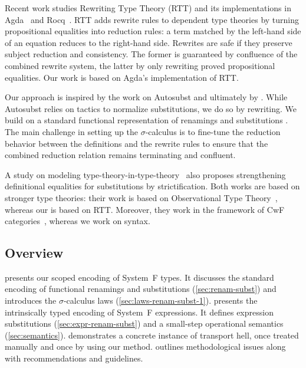 \documentclass[manuscript,screen,review,anonymous,acmsmall]{acmart}
\begin{document}
Recent work studies Rewriting Type Theory (RTT)
\cite{10.1145/3434341} and its implementations in Agda~\cite{cockx:LIPIcs.TYPES.2019.2} and
Rocq~\cite{leray_et_al:LIPIcs.ITP.2024.26,10.1145/3776704}. 
RTT adds rewrite rules to dependent type theories
by turning propositional equalities into reduction rules: a term matched by the
left-hand side of an equation reduces to the right-hand side. 
Rewrites are safe if they preserve subject reduction and
consistency. The former is guaranteed by confluence of the combined
rewrite system, the latter by only rewriting
proved propositional equalities.
Our work is based on Agda's implementation of RTT.

Our approach is inspired by the work on Autosubst
\cite{schafer2015autosubst,Stark:2020:Mechanising,10.1145/3293880.3294101}
and ultimately by \citet{10.1145/96709.96712}.
While Autosubst relies on tactics to normalize substitutions, we do so
by rewriting. We build on a standard functional representation of
renamings and substitutions \cite{DBLP:journals/jar/BentonHKM12}. 
The main challenge in setting up the $\sigma$-calculus is to fine-tune the
reduction behavior between the definitions and the rewrite rules to ensure that the combined
reduction relation remains terminating and confluent.

A study on modeling type-theory-in-type-theory~\cite{DBLP:journals/pacmpl/KaposiP25}
also proposes strengthening definitional equalities for substitutions by strictification. 
Both works are based on stronger type theories: their work is based on Observational Type Theory~\cite{DBLP:conf/plpv/AltenkirchMS07,DBLP:journals/pacmpl/PujetT22}, whereas our is based on RTT.
Moreover, they work in the framework of CwF categories~\cite{DBLP:conf/popl/AltenkirchK16}, whereas we work on syntax.


\subsection*{Overview}

 presents our scoped encoding of System~F types. It discusses the
standard encoding of functional renamings and substitutions (\cref{sec:renam-subst}) and
introduces the  $\sigma$-calculus laws
(\cref{sec:laws-renam-subst-1}).  presents the intrinsically
typed encoding of System~F expressions. It defines expression substitutions
(\cref{sec:expr-renam-subst}) and a small-step operational semantics (\cref{sec:semantics}).
 demonstrates a concrete instance of transport hell, once treated
manually and once by using our method.
 outlines methodological issues along with recommendations and guidelines.
\end{document}
